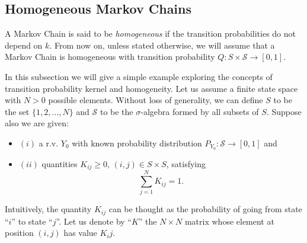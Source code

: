 \subsection{Homogeneous Markov Chains}

A Markov Chain is said to be {\it homogeneous} if the transition probabilities do not depend on $k$.
From now on, unless stated otherwise,
we will assume that a Markov Chain is homogeneous with transition probability $Q:S\times\mathcal{S}\rightarrow [0,1]$.

In this subsection we will give a simple example exploring the concepts of transition probability kernel and homogeneity.
Let us assume a finite state space with $N>0$ possible elements.
Without loss of generality, we can define $S$ to be the set $\{1,2,\ldots,N\}$ and $\mathcal{S}$ to be the $\sigma$-algebra formed by all subsets of $S$.
Suppose also we are given:
{\renewcommand{\labelitemi}{}
\begin{itemize}
\item $(i)$ a r.v. $Y_0$ with known probability distribution $P_{Y_0}:\mathcal{S}\rightarrow [0,1]$ and
\item {$(ii)$ quantities ${K}_{ij}\geqslant 0$, $(i,j)\in S\times S$, satisfying
\begin{equation*}
\sum_{j=1}^{N}{K}_{ij} = 1.
\end{equation*}
}
\end{itemize}
}
Intuitively, the quantity ${K}_{ij}$ can be thought as the probability of going from state ``$i$'' to state ``$j$''.
Let us denote by ``$K$'' the $N\times N$ matrix whose element at position $(i,j)$ has value ${K}_ij$.

